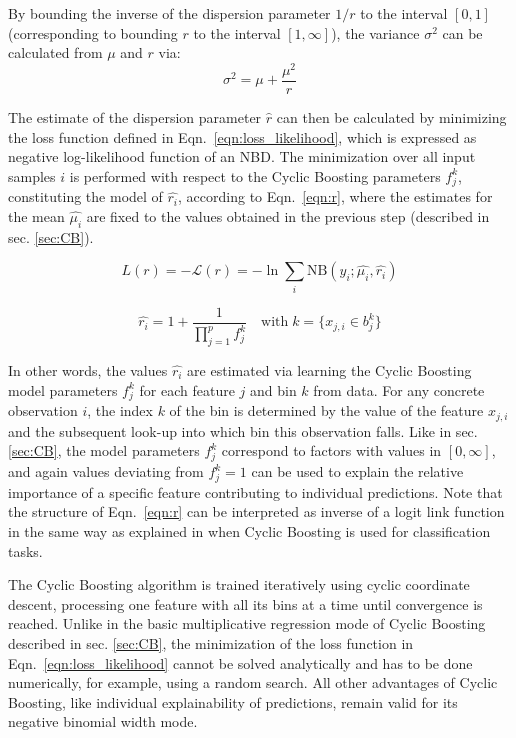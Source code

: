\documentclass[BCOR=1mm, DIV=calc,10pt,
twoside=true,
twocolumn,
headings=normal]{scrartcl}
\newcommand{\eqn}{Eqn.~}
\begin{document}
By bounding the inverse of the dispersion parameter $1/r$ to the interval $[0, 1]$ (corresponding to bounding $r$ to the interval $[1, \infty]$), the variance $\sigma^2$ can be calculated from $\mu$ and $r$ via:
\begin{equation} \label{eqn:variance_r}
\sigma^2 = \mu + \frac{\mu^2}{r}
\end{equation}

The estimate of the dispersion parameter $\hat{r}$ can then be calculated by minimizing the loss function defined in \eqn \eqref{eqn:loss_likelihood}, which is expressed as negative log-likelihood function of an NBD. The minimization over all input samples $i$ is performed with respect to the Cyclic Boosting parameters $f^k_j$, constituting the model of $\hat{r_i}$, according to \eqn \eqref{eqn:r}, where the estimates for the mean $\hat{\mu_i}$ are fixed to the values obtained in the previous step (described in sec. \ref{sec:CB}).

\begin{equation} \label{eqn:loss_likelihood}
L(r) = -\mathcal{L}(r) = -\ln \sum_i \mathrm{NB}(y_i; \hat{\mu_i}, \hat{r_i})
\end{equation}

\begin{equation} \label{eqn:r}
\hat{r_i} = 1 +  \frac{1}{\prod \limits_{j=1}^p f^k_j} \quad \text{with}\; k=\{ x_{j,i} \in b^k_j\}
\end{equation}

In other words, the values $\hat{r_i}$ are estimated via learning the Cyclic Boosting model parameters $f^k_j$ for each feature $j$ and bin $k$ from data. For any concrete observation $i$, the index $k$ of the bin is determined by the value of the feature $x_{j,i}$ and the subsequent look-up into which bin this observation falls. Like in sec. \ref{sec:CB}, the model parameters $f^k_j$ correspond to factors with values in $[0, \infty]$, and again values deviating from $f^k_j=1$ can be used to explain the relative importance of a specific feature contributing to individual predictions. Note that the structure of \eqn \eqref{eqn:r} can be interpreted as inverse of a logit link function in the same way as explained in \cite{Wick2019} when Cyclic Boosting is used for classification tasks.

The Cyclic Boosting algorithm is trained iteratively using cyclic coordinate descent, processing one feature with all its bins at a time until convergence is reached. Unlike in the basic multiplicative regression mode of Cyclic Boosting described in sec. \ref{sec:CB}, the minimization of the loss function in \eqn \eqref{eqn:loss_likelihood} cannot be solved analytically and has to be done numerically, for example, using a random search. All other advantages of Cyclic Boosting, like individual explainability of predictions, remain valid for its negative binomial width mode.
\end{document}
